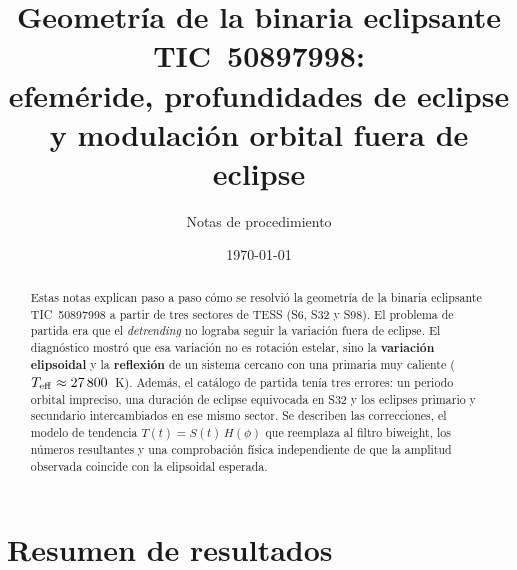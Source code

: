 \documentclass[11pt,a4paper]{article}
\title{Geometría de la binaria eclipsante TIC~50897998:\\
efeméride, profundidades de eclipse y modulación orbital fuera de eclipse}
\author{Notas de procedimiento}
\date{\today}
\newcommand{\teff}{T_{\rm eff}}
\begin{document}
\maketitle

\begin{abstract}
Estas notas explican paso a paso cómo se resolvió la geometría de la binaria eclipsante
TIC~50897998 a partir de tres sectores de TESS (S6, S32 y S98). El problema de partida era
que el \emph{detrending} no lograba seguir la variación fuera de eclipse. El diagnóstico mostró
que esa variación no es rotación estelar, sino la \textbf{variación elipsoidal} y la
\textbf{reflexión} de un sistema cercano con una primaria muy caliente
($\teff\approx 27\,800$~K). Además, el catálogo de partida tenía tres errores: un periodo
orbital impreciso, una duración de eclipse equivocada en S32 y los eclipses primario y
secundario intercambiados en ese mismo sector. Se describen las correcciones, el modelo de
tendencia $T(t)=S(t)\,H(\phi)$ que reemplaza al filtro biweight, los números resultantes y
una comprobación física independiente de que la amplitud observada coincide con la elipsoidal
esperada.
\end{abstract}

\tableofcontents

\section{Resumen de resultados}
\end{document}
